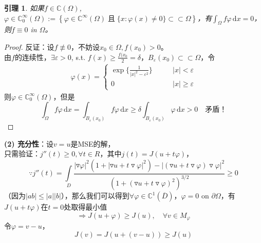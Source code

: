 \documentclass[11pt, a4paper]{article}
\theoremstyle{theorem}
\newtheorem{lemma}[thm]{引理}
\newcommand{\intd}[1]{\,\mathrm{d}{#1}}
\begin{document}
\begin{lemma}
如果$f \in \mathbb{C}(\Omega)$, $\varphi \in \mathbb{C}_0^\infty (\Omega) := \left\{\varphi \in \mathbb{C}^\infty(\Omega) \; \text{且} \; \{x: \varphi(x) \neq 0\} \subset \subset \Omega\right\}$，有$\int_\Omega f \varphi \intd x = 0$，则$f \equiv 0$ in $\Omega$。
\end{lemma}

\begin{proof}
反证：设$f \not\equiv 0$，不妨设$x_0 \in \Omega, f(x_0) > 0$。\\
由$f$的连续性，$\exists \varepsilon > 0$, s.t. $f(x) \geq \frac{f(x_0}{2} = \delta$，$B_\varepsilon (x_0) \subset \subset \Omega$，令
\begin{align*}
\varphi(x) = \begin{cases}
\exp\{\frac{1}{|x|^2 - \varepsilon^2}\} \quad \quad &|x| < \varepsilon \\
0 \quad \quad &|x| \geq \varepsilon
\end{cases}
\end{align*}
则$\varphi \in \mathbb{C}_0^\infty (\Omega)$，但是
$$
\int_\Omega f \varphi \intd x = \int_{B_\varepsilon(x_0)} f \varphi \intd x \geq \delta \int_{B_\varepsilon(x_0)} \varphi \intd x> 0  \quad \text{矛盾！}
$$
\end{proof}

\textbf{(2) 充分性}：设$v= u$是MSE的解，\\
只需验证：$j''(t) \geq 0, \forall t \in R$，其中$j(t) = J(u + t \varphi)$，
$$
\because j''(t) = \int\limits_D \frac{|\triangledown \varphi|^2 (1 + |\triangledown u + t \triangledown \varphi|^2) - |(\triangledown u + t \triangledown \varphi) \triangledown \varphi|^2}{(1 + (\triangledown u + t \triangledown \varphi)^2)^{3/2}} \geq 0
$$
（因为$|ab| \leq |a||b|$），那么我们可以得到$\forall \varphi \in \mathbb{C}^1(\overline{D})$，$\varphi = 0$ on $\partial \Omega$，有$J(u + t \varphi)$在$t = 0$处取得最小值
$$\Longrightarrow J(u + \varphi) \geq J(u), \quad \forall v \in M_\varphi$$
令$\varphi = v - u$，
$$
J(v) = J(u + (v - u)) \geq J(u)
$$
\end{document}
